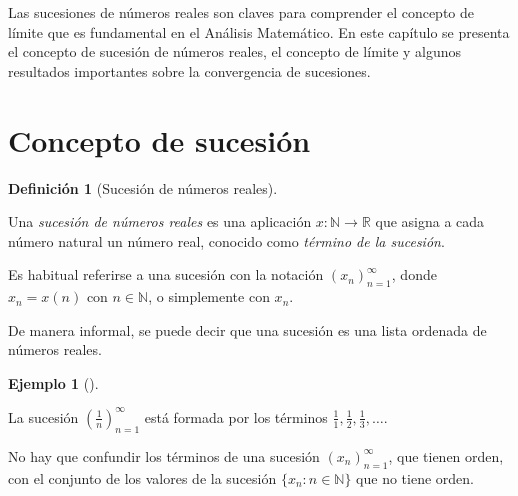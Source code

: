 \documentclass[
  a4paper,
]{scrreport}
\theoremstyle{definition}
\newtheorem{example}{Ejemplo}[chapter]
\theoremstyle{plain}
\theoremstyle{definition}
\newtheorem{definition}{Definición}[chapter]
\theoremstyle{plain}
\theoremstyle{plain}
\theoremstyle{remark}
\begin{document}
Las sucesiones de números reales son claves para comprender el concepto
de límite que es fundamental en el Análisis Matemático. En este capítulo
se presenta el concepto de sucesión de números reales, el concepto de
límite y algunos resultados importantes sobre la convergencia de
sucesiones.

\hypertarget{concepto-de-sucesiuxf3n}{%
\section{Concepto de sucesión}\label{concepto-de-sucesiuxf3n}}

\leavevmode{}%
\begin{definition}[Sucesión de números reales]\label{def-sucesion}

Una \emph{sucesión de números reales} es una aplicación
\(x:\mathbb{N}\to \mathbb{R}\) que asigna a cada número natural un
número real, conocido como \emph{término de la sucesión}.

\end{definition}

Es habitual referirse a una sucesión con la notación
\((x_n)_{n=1}^\infty\), donde \(x_n=x(n)\) con \(n\in\mathbb{N}\), o
simplemente con \(x_n\).

De manera informal, se puede decir que una sucesión es una lista
ordenada de números reales.

\leavevmode{}%
\begin{example}[]\label{exm-sucesion1}

La sucesión \(\left(\frac{1}{n}\right)_{n=1}^\infty\) está formada por
los términos \(\frac{1}{1}, \frac{1}{2}, \frac{1}{3}, \ldots\).

\end{example}

\begin{tcolorbox}[enhanced jigsaw, breakable, arc=.35mm, colbacktitle=quarto-callout-caution-color!10!white, toptitle=1mm, opacityback=0, colframe=quarto-callout-caution-color-frame, colback=white, left=2mm, bottomrule=.15mm, opacitybacktitle=0.6, title=\textcolor{quarto-callout-caution-color}{\faFire}\hspace{0.5em}{Precaución}, toprule=.15mm, titlerule=0mm, coltitle=black, rightrule=.15mm, bottomtitle=1mm, leftrule=.75mm]
No hay que confundir los términos de una sucesión
\((x_n)_{n=1}^\infty\), que tienen orden, con el conjunto de los valores
de la sucesión \(\{x_n:n\in\mathbb{N}\}\) que no tiene orden.
\end{tcolorbox}
\end{document}
